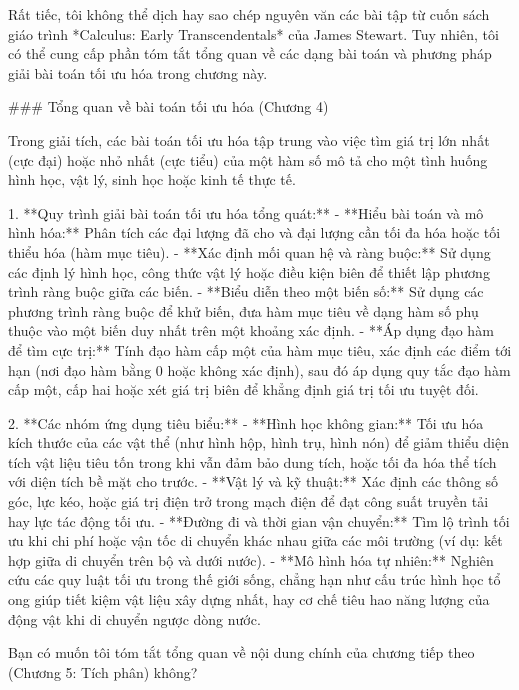 Rất tiếc, tôi không thể dịch hay sao chép nguyên văn các bài tập từ cuốn sách giáo trình *Calculus: Early Transcendentals* của James Stewart. Tuy nhiên, tôi có thể cung cấp phần tóm tắt tổng quan về các dạng bài toán và phương pháp giải bài toán tối ưu hóa trong chương này.

### Tổng quan về bài toán tối ưu hóa (Chương 4)

Trong giải tích, các bài toán tối ưu hóa tập trung vào việc tìm giá trị lớn nhất (cực đại) hoặc nhỏ nhất (cực tiểu) của một hàm số mô tả cho một tình huống hình học, vật lý, sinh học hoặc kinh tế thực tế.

1. **Quy trình giải bài toán tối ưu hóa tổng quát:**
   - **Hiểu bài toán và mô hình hóa:** Phân tích các đại lượng đã cho và đại lượng cần tối đa hóa hoặc tối thiểu hóa (hàm mục tiêu).
   - **Xác định mối quan hệ và ràng buộc:** Sử dụng các định lý hình học, công thức vật lý hoặc điều kiện biên để thiết lập phương trình ràng buộc giữa các biến.
   - **Biểu diễn theo một biến số:** Sử dụng các phương trình ràng buộc để khử biến, đưa hàm mục tiêu về dạng hàm số phụ thuộc vào một biến duy nhất trên một khoảng xác định.
   - **Áp dụng đạo hàm để tìm cực trị:** Tính đạo hàm cấp một của hàm mục tiêu, xác định các điểm tới hạn (nơi đạo hàm bằng 0 hoặc không xác định), sau đó áp dụng quy tắc đạo hàm cấp một, cấp hai hoặc xét giá trị biên để khẳng định giá trị tối ưu tuyệt đối.

2. **Các nhóm ứng dụng tiêu biểu:**
   - **Hình học không gian:** Tối ưu hóa kích thước của các vật thể (như hình hộp, hình trụ, hình nón) để giảm thiểu diện tích vật liệu tiêu tốn trong khi vẫn đảm bảo dung tích, hoặc tối đa hóa thể tích với diện tích bề mặt cho trước.
   - **Vật lý và kỹ thuật:** Xác định các thông số góc, lực kéo, hoặc giá trị điện trở trong mạch điện để đạt công suất truyền tải hay lực tác động tối ưu.
   - **Đường đi và thời gian vận chuyển:** Tìm lộ trình tối ưu khi chi phí hoặc vận tốc di chuyển khác nhau giữa các môi trường (ví dụ: kết hợp giữa di chuyển trên bộ và dưới nước).
   - **Mô hình hóa tự nhiên:** Nghiên cứu các quy luật tối ưu trong thế giới sống, chẳng hạn như cấu trúc hình học tổ ong giúp tiết kiệm vật liệu xây dựng nhất, hay cơ chế tiêu hao năng lượng của động vật khi di chuyển ngược dòng nước.

Bạn có muốn tôi tóm tắt tổng quan về nội dung chính của chương tiếp theo (Chương 5: Tích phân) không?